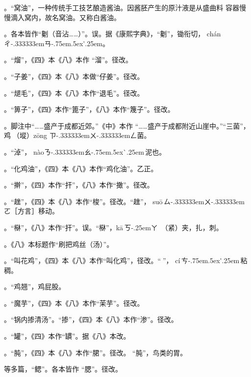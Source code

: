。“窝油”，一种传统手工技艺酿造酱油。因酱胚产生的原汁液是从盛曲料
容器慢慢滴入窝内，故名窝油。又称白酱油。

。各本皆作“劖（音沾……）”。误。据《康熙字典》，“劖”，锄衔切，
{ch\'{a}n}{ㄔ\kern-.333333emㄢ\kern-.75em\raise.5ex\hbox{\'{}}\kern.25em}。

。“熘”，《四》本《八》本作
“溜”。径改。

。“子姜”，《四》本《八》本做“仔姜”。径改。

。“煺毛”，《四》本《八》本作“退毛”。径改。

。“箅子”，《四》本作“篦子”，《八》本作“篾子”。径改。

。脚注{\footnotesize{}}中“……盛产于成都近郊。”《中》本作
“……盛产于成都附近山崖中。”“三菌”，鸡𭎂（㙡）{z\={o}ng}%
{ㄗ\kern-.333333emㄨ\kern-.333333emㄥ}菌。

。“淖”，
{n\`{a}o}{ㄋ\kern-.333333emㄠ\kern-.75em\raise.5ex\hbox{\`{}}\kern.25em}\,泥也。

。“化鸡油”，《四》本《八》本作“鸡化油”。乙正。

。“擀”，《四》本作“扞”，《八》本作“撖”。径改。

。“趖”，《四》本《八》本作“梭”。径改。“趖”，
{su\={o}}\,{ㄙ\kern-.333333emㄨ\kern-.333333emㄛ}［方言］移动。

。“㮟”，《八》本作“扞”。误。“㮟”，{k\={a}}\,{ㄎ\kern-.25emㄚ}\,%
（紧）夹，扎，刺。

。《八》本标题作“刷把鸡丝（汤）”。

。“叫花鸡”，《四》本《八》本作“叫化鸡”，径改。“𫃕”，%
{c\'{i}}\,{ㄘ\kern-.75em\raise.5ex\hbox{\'{}}\kern.25em}\,粘稠。

。“鸡翘”，鸡屁股。

。“魔芋”，《四》本《八》本作“茉芋”。径改。

。“锅内掺清汤”。“掺”，《四》本《八》本作“渗”。径改。

。“罐”，《四》本作“罆”。据《八》本改。

。“肫”，《四》本《八》本作“𬂁”。径改。
“肫”，鸟类的胃。

等多篇，“鳃”。各本皆作
“腮”。径改。


